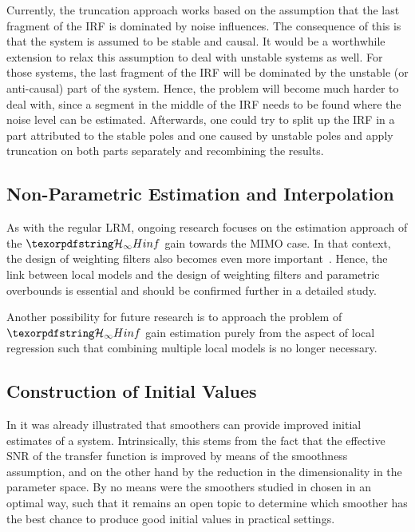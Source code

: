    Currently, the truncation approach works based on the assumption that the last fragment of the \gls{IRF} is dominated by noise influences.
   The consequence of this is that the system is assumed to be stable and causal.
   It would be a worthwhile extension to relax this assumption to deal with unstable systems as well.
   For those systems, the last fragment of the \gls{IRF} will be dominated by the unstable (or anti-causal) part of the system. 
   Hence, the problem will become much harder to deal with, since a segment in the middle of the \gls{IRF} needs to be found where the noise level can be estimated.
   Afterwards, one could try to split up the \gls{IRF} in a part attributed to the stable poles and one caused by unstable poles and apply truncation on both parts separately and recombining the results.

  \subsection{Non-Parametric Estimation and Interpolation}
  As with the regular \gls{LRM}, ongoing research focuses on the estimation approach of the $\Hinf{}$ gain towards the \gls{MIMO} case.
  In that context, the design of weighting filters also becomes even more important~\citep{Boeren2013}.
  Hence, the link between local models and the design of weighting filters and parametric overbounds is essential and should be confirmed further in a detailed study.

  Another possibility for future research is to approach the problem of $\Hinf$ gain estimation purely from the aspect of local regression such that combining multiple local models is no longer necessary.

  \subsection{Construction of Initial Values}
  In  it was already illustrated that smoothers can provide improved initial estimates of a system. 
  Intrinsically, this stems from the fact that the effective \gls{SNR} of the transfer function is improved by means of the smoothness assumption, and on the other hand by the reduction in the dimensionality in the parameter space.
  By no means were the  smoothers studied in  chosen in an optimal way, such that it remains an open topic to determine which smoother has the best chance to produce good initial values in practical settings.

